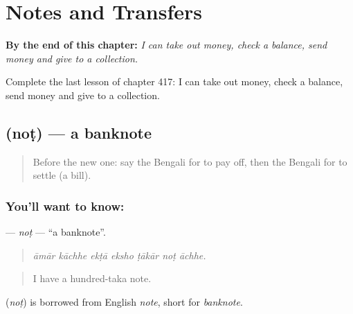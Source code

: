 
\chapter{Notes and Transfers}
\label{ch:bn-notes-and-transfers}

\begin{chapteropening}
\textbf{By the end of this chapter:} \emph{I can take out money, check a balance, send money and give to a collection.}

Complete the last lesson of chapter 417: I can take out money, check a balance, send money and give to a collection.
\end{chapteropening}

\section[\texorpdfstring{\bn{নোট} (noṭ)}{নোট (noṭ)}]{ (noṭ) — a banknote}

\label{lesson:BN-C417-not}



\begin{quote}
Before the new one: say the Bengali for to pay off, then the Bengali for to settle (a bill).
\end{quote}

\subsection*{You'll want to know: }
\textbf{} — \emph{noṭ} — \textquotedblleft{}a banknote\textquotedblright{}.

\begin{quote}
      
\end{quote}

\begin{quote}
\emph{āmār kāchhe ekṭā eksho ṭākār noṭ āchhe.}
\end{quote}

\begin{quote}
I have a hundred-taka note.
\end{quote}

\begin{cousinweb}
\textbf{} (\emph{noṭ}) is borrowed from English \emph{note}, short for \emph{banknote}.
\end{cousinweb}

